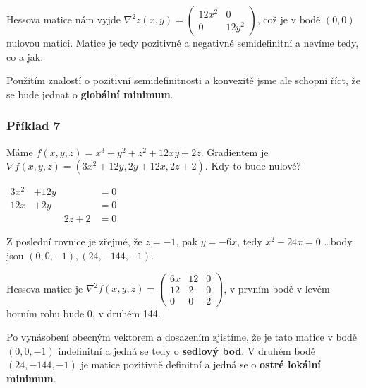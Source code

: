 \vspace{6pt}
\noindent Hessova matice nám vyjde $\nabla^2 z(x, y) = \begin{pmatrix}
    12 x^2 & 0 \\
    0 & 12 y^2
\end{pmatrix}$, což je v bodě $(0, 0)$ nulovou maticí. Matice je tedy pozitivně a negativně semidefinitní a nevíme tedy, co a jak.

Použitím znalostí o pozitivní semidefinitnosti a konvexitě jsme ale schopni říct, že se bude jednat o \textbf{globální minimum}.

\subsubsection*{Příklad 7}

Máme $f(x,y,z) = x^3 + y^2 + z^2 + 12xy + 2z$. Gradientem je $\nabla f(x,y,z) = (3x^2 + 12y, 2y + 12x, 2z + 2)$. Kdy to bude nulové?

\vspace{6pt}
\noindent $\begin{matrix}
    3x^2 & + 12y & & = 0 \\
    12x & + 2y & & = 0 \\
       &  &  2z + 2 & = 0
\end{matrix}$

\vspace{6pt}
\noindent Z poslední rovnice je zřejmé, že $z = -1$, pak $y = -6x$, tedy $x^2 - 24x = 0$ \ldots body jsou ${(0,0,-1), (24, -144, -1)}$.

\vspace{6pt}
\noindent Hessova matice je $\nabla^2 f(x, y, z) = \begin{pmatrix}
    6x & 12 & 0 \\
    12 & 2 & 0 \\
    0 & 0 & 2
\end{pmatrix}$, v prvním bodě v levém horním rohu bude 0, v druhém 144.

Po vynásobení obecným vektorem a dosazením zjistíme, že je tato matice v bodě $(0,0,-1)$ indefinitní a jedná se tedy o \textbf{sedlový bod}. V druhém bodě $(24,-144,-1)$ je matice pozitivně definitní a jedná se o \textbf{ostré lokální minimum}.
